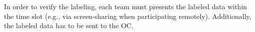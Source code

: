 \documentclass[12pt,twoside]{article}
\begin{document}
In order to verify the labeling, each team must presents the labeled data
within the time slot (e.g., via screen-sharing when participating remotely).
Additionally, the labeled data has to be sent to the \ac{OC}.


%
%
%
%
%
\end{document}
